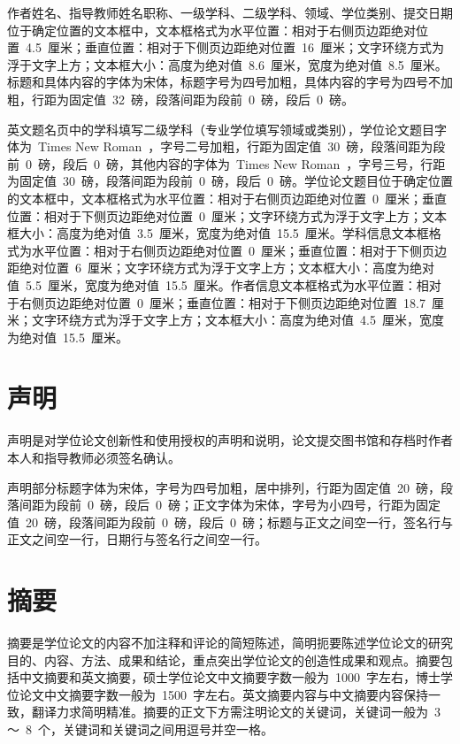 作者姓名、指导教师姓名职称、一级学科、二级学科、领域、学位类别、提交日期位于确定位置的文本框中，文本框格式为水平位置：相对于右侧页边距绝对位置~4.5~厘米；垂直位置：相对于下侧页边距绝对位置~16~厘米；文字环绕方式为浮于文字上方；文本框大小：高度为绝对值~8.6~厘米，宽度为绝对值~8.5~厘米。标题和具体内容的字体为宋体，标题字号为四号加粗，具体内容的字号为四号不加粗，行距为固定值~32~磅，段落间距为段前~0~磅，段后~0~磅。

英文题名页中的学科填写二级学科（专业学位填写领域或类别），学位论文题目字体为~Times New Roman~，字号二号加粗，行距为固定值~30~磅，段落间距为段前~0~磅，段后~0~磅，其他内容的字体为~Times New Roman~，字号三号，行距为固定值~30~磅，段落间距为段前~0~磅，段后~0~磅。学位论文题目位于确定位置的文本框中，文本框格式为水平位置：相对于右侧页边距绝对位置~0~厘米；垂直位置：相对于下侧页边距绝对位置~0~厘米；文字环绕方式为浮于文字上方；文本框大小：高度为绝对值~3.5~厘米，宽度为绝对值~15.5~厘米。学科信息文本框格式为水平位置：相对于右侧页边距绝对位置~0~厘米；垂直位置：相对于下侧页边距绝对位置~6~厘米；文字环绕方式为浮于文字上方；文本框大小：高度为绝对值~5.5~厘米，宽度为绝对值~15.5~厘米。作者信息文本框格式为水平位置：相对于右侧页边距绝对位置~0~厘米；垂直位置：相对于下侧页边距绝对位置~18.7~厘米；文字环绕方式为浮于文字上方；文本框大小：高度为绝对值~4.5~厘米，宽度为绝对值~15.5~厘米。

\section{声明}

声明是对学位论文创新性和使用授权的声明和说明，论文提交图书馆和存档时作者本人和指导教师必须签名确认。

声明部分标题字体为宋体，字号为四号加粗，居中排列，行距为固定值~20~磅，段落间距为段前~0~磅，段后~0~磅；正文字体为宋体，字号为小四号，行距为固定值~20~磅，段落间距为段前~0~磅，段后~0~磅；标题与正文之间空一行，签名行与正文之间空一行，日期行与签名行之间空一行。

\section{摘要}

摘要是学位论文的内容不加注释和评论的简短陈述，简明扼要陈述学位论文的研究目的、内容、方法、成果和结论，重点突出学位论文的创造性成果和观点。摘要包括中文摘要和英文摘要，硕士学位论文中文摘要字数一般为~1000~字左右，博士学位论文中文摘要字数一般为~1500~字左右。英文摘要内容与中文摘要内容保持一致，翻译力求简明精准。摘要的正文下方需注明论文的关键词，关键词一般为~3~ ～~8~个，关键词和关键词之间用逗号并空一格。

